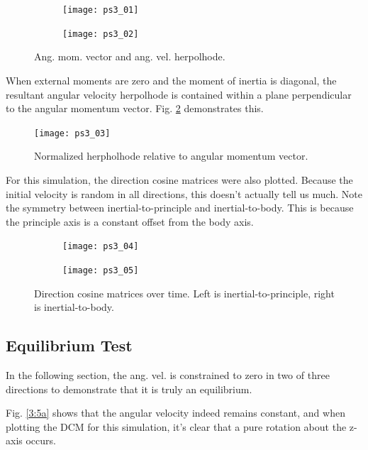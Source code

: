 \documentclass[12pt, letterpaper]{article}
\begin{document}
\begin{figure}[H]
	\centering
	\begin{subfigure}[b]{0.49\textwidth}
		\texttt{[image: ps3\_01]}
	\end{subfigure}
	\begin{subfigure}[b]{0.49\textwidth}
		\texttt{[image: ps3\_02]}
	\end{subfigure}
	\caption{Ang. mom. vector and ang. vel. herpolhode.}
	\label{3:herpolhode}
\end{figure}

When external moments are zero and the moment of inertia is diagonal, the resultant angular velocity herpolhode is contained within a plane perpendicular to the angular momentum vector. Fig. \ref{3:normHerpol} demonstrates this.

\begin{figure}[H]
	\centering
	\texttt{[image: ps3\_03]}
	\caption{Normalized herpholhode relative to angular momentum vector.}
	\label{3:normHerpol}
\end{figure}

For this simulation, the direction cosine matrices were also plotted. Because the initial velocity is random in all directions, this doesn't actually tell us much. Note the symmetry between inertial-to-principle and inertial-to-body. This is because the principle axis is a constant offset from the body axis.

\begin{figure}[H]
	\centering
	\begin{subfigure}[b]{0.49\textwidth}
		\texttt{[image: ps3\_04]}
	\end{subfigure}
	\begin{subfigure}[b]{0.49\textwidth}
		\texttt{[image: ps3\_05]}
	\end{subfigure}
	\caption{Direction cosine matrices over time. Left is inertial-to-principle, right is inertial-to-body.}
	\label{3:dcmplot}
\end{figure}


\subsection{Equilibrium Test}

In the following section, the ang. vel. is constrained to zero in two of three directions to demonstrate that it is truly an equilibrium. 

Fig. \ref{3:5a} shows that the angular velocity indeed remains constant, and when plotting the DCM for this simulation, it's clear that a pure rotation about the z-axis occurs.
\end{document}
